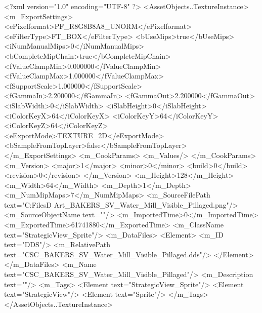 <?xml version="1.0" encoding="UTF-8" ?>
<AssetObjects..TextureInstance>
	<m_ExportSettings>
		<ePixelformat>PF_R8G8B8A8_UNORM</ePixelformat>
		<eFilterType>FT_BOX</eFilterType>
		<bUseMips>true</bUseMips>
		<iNumManualMips>0</iNumManualMips>
		<bCompleteMipChain>true</bCompleteMipChain>
		<fValueClampMin>0.000000</fValueClampMin>
		<fValueClampMax>1.000000</fValueClampMax>
		<fSupportScale>1.000000</fSupportScale>
		<fGammaIn>2.200000</fGammaIn>
		<fGammaOut>2.200000</fGammaOut>
		<iSlabWidth>0</iSlabWidth>
		<iSlabHeight>0</iSlabHeight>
		<iColorKeyX>64</iColorKeyX>
		<iColorKeyY>64</iColorKeyY>
		<iColorKeyZ>64</iColorKeyZ>
		<eExportMode>TEXTURE_2D</eExportMode>
		<bSampleFromTopLayer>false</bSampleFromTopLayer>
	</m_ExportSettings>
	<m_CookParams>
		<m_Values/>
	</m_CookParams>
	<m_Version>
		<major>1</major>
		<minor>0</minor>
		<build>0</build>
		<revision>0</revision>
	</m_Version>
	<m_Height>128</m_Height>
	<m_Width>64</m_Width>
	<m_Depth>1</m_Depth>
	<m_NumMipMaps>7</m_NumMipMaps>
	<m_SourceFilePath text="C:\Users\Shadow\Desktop\Working Files\2D Art\Quarters\Bakers\StrategicView\CSC_BAKERS_SV_Water_Mill_Visible_Pillaged.png"/>
	<m_SourceObjectName text=""/>
	<m_ImportedTime>0</m_ImportedTime>
	<m_ExportedTime>61741880</m_ExportedTime>
	<m_ClassName text="StrategicView_Sprite"/>
	<m_DataFiles>
		<Element>
			<m_ID text="DDS"/>
			<m_RelativePath text="CSC_BAKERS_SV_Water_Mill_Visible_Pillaged.dds"/>
		</Element>
	</m_DataFiles>
	<m_Name text="CSC_BAKERS_SV_Water_Mill_Visible_Pillaged"/>
	<m_Description text=""/>
	<m_Tags>
		<Element text="StrategicView_Sprite"/>
		<Element text="StrategicView"/>
		<Element text="Sprite"/>
	</m_Tags>
</AssetObjects..TextureInstance>

